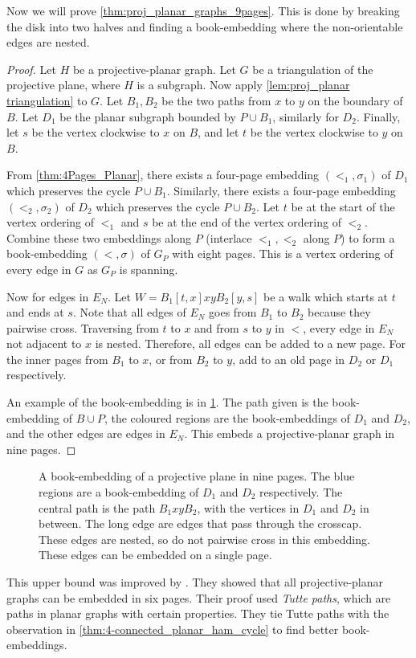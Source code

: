 Now we will prove \cref{thm:proj_planar_graphs_9pages}. This is done by breaking the disk into two halves and finding a book-embedding where the non-orientable edges are nested.
\begin{proof}
    Let $H$ be a projective-planar graph. Let $G$ be a triangulation of the projective plane, where $H$ is a subgraph.
    Now apply \cref{lem:proj_planar triangulation} to $G$. Let $B_1, B_2$ be the two paths from $x$ to $y$ on the boundary of $B$. Let $D_1$ be the planar subgraph bounded by $P \cup B_1$, similarly for $D_2$. Finally, let $s$ be the vertex clockwise to $x$ on $B$, and let $t$ be the vertex clockwise to $y$ on $B$.

    From \cref{thm:4Pages_Planar}, there exists a four-page embedding $(<_1, \sigma_1)$ of $D_1$ which preserves the cycle $P \cup B_1$. Similarly, there exists a four-page embedding $(<_2, \sigma_2)$ of $D_2$ which preserves the cycle $P \cup B_2$.
    Let $t$ be at the start of the vertex ordering of $<_1$ and $s$ be at the end of the vertex ordering of $<_2$. 
    Combine these two embeddings along $P$ (interlace $<_1, <_2$ along $P$) to form a book-embedding $(<, \sigma)$ of $G_P$ with eight pages. This is a vertex ordering of every edge in $G$ as $G_P$ is spanning. 

    Now for edges in $E_N$. Let $W = B_1[t, x] xy B_2[y, s]$ be a walk which starts at $t$ and ends at $s$. Note that all edges of $E_N$ goes from $B_1$ to $B_2$ because they pairwise cross. Traversing from $t$ to $x$ and from $s$ to $y$ in $<$, every edge in $E_N$ not adjacent to $x$ is nested. Therefore, all edges can be added to a new page. For the inner pages from $B_1$ to $x$, or from $B_2$ to $y$, add to an old page in $D_2$ or $D_1$ respectively. 

    An example of the book-embedding is in \cref{fig:projectiveplanarbookembedding}. The path given is the book-embedding of $B \cup P$, the coloured regions are the book-embeddings of $D_1$ and $D_2$, and the other edges are edges in $E_N$. 
    This embeds a projective-planar graph in nine pages.
\end{proof}


\begin{figure}[h]
    \centering
    
    \caption[Projective-planar book-embedding]{A book-embedding of a projective plane in nine pages. The blue regions are a book-embedding of $D_1$ and $D_2$ respectively. The central path is the path $B_1 xy B_2$, with the vertices in $D_1$ and $D_2$ in between. The long edge are edges that pass through the crosscap. These edges are nested, so do not pairwise cross in this embedding. These edges can be embedded on a single page. }\label{fig:projectiveplanarbookembedding}
\end{figure}
 This upper bound was improved by \textcite{ozekiBookEmbeddingGraphs2019}. They showed that all projective-planar graphs can be embedded in six pages. Their proof used \textit{Tutte paths}, which are paths in planar graphs with certain properties. They tie Tutte paths with the observation in \cref{thm:4-connected_planar_ham_cycle} to find better book-embeddings. 
